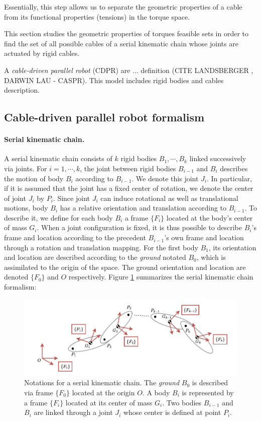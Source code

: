 Essentially, this step allows us to separate the geometric properties of a cable from its functional properties (tensions) in the torque space.

This section studies the geometric properties of torques feasible sets in order to find the set of all possible cables of a serial kinematic chain whose joints are actuated by rigid cables.

A \emph{cable-driven parallel robot} (CDPR) are ... definition (CITE LANDSBERGER , DARWIN LAU - CASPR).
This model includes rigid bodies and cables description.

\subsection{Cable-driven parallel robot formalism}
\paragraph*{Serial kinematic chain.} A serial kinematic chain consists of $k$ rigid bodies $B_1, \cdots, B_k$ linked successively via joints. For $i = 1, \cdots, k$, the joint between rigid bodies $B_{i-1}$ and $B_i$ describes the motion of body $B_i$ according to $B_{i-1}$. We denote this joint $J_i$. In particular, if it is assumed that the joint has a fixed center of rotation, we denote the center of joint $J_i$ by $P_i$. Since joint $J_i$ can induce rotational as well as translational motions, body $B_i$ has a relative orientation and translation according to $B_{i-1}$. To describe it, we define for each body $B_i$ a frame $\{F_i\}$ located at the body's center of mass $G_i$. When a joint configuration is fixed, it is thus possible to describe $B_i$'s frame and location according to the precedent $B_{i-1}$'s own frame and location through a rotation and translation mapping. For the first body $B_1$, its orientation and location are described according to the \emph{ground} notated $B_0$, which is assimilated to the origin of the space. The ground orientation and location are denoted $\{F_0\}$ and $O$ respectively. Figure \ref{fig:general_rigid_body_model} summarizes the serial kinematic chain formalism:
\begin{figure}[!htb]
    \captionsetup{justification=centering}
        \centering
        \includegraphics[trim={0 0 0 0},clip,width=1\linewidth]{img/chapter_4/general_rigid_body_model.pdf}
    \caption{Notations for a serial kinematic chain. The \emph{ground} $B_0$ is described via frame $\{F_0\}$ located at the origin $O$. A body $B_i$ is represented by a frame $\{F_i\}$ located at its center of mass $G_i$. Two bodies $B_{i-1}$ and $B_i$ are linked through a joint $J_i$ whose center is defined at point $P_i$. }
    \label{fig:general_rigid_body_model}
\end{figure}

